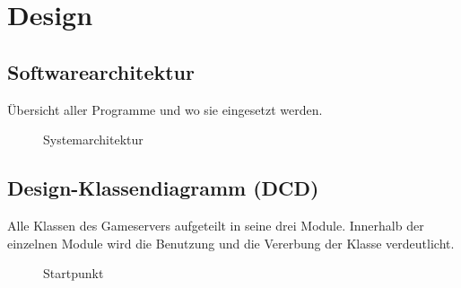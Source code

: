 \documentclass[11pt,ngerman]{article}
\begin{document}


    \section{Design}

    \subsection{Softwarearchitektur}
    Übersicht aller Programme und wo sie eingesetzt werden.
	\begin{figure}[H]
		\centering
		\caption{Systemarchitektur}
		\label{fig:Systemarchitecture}
	\end{figure}

    \subsection{Design-Klassendiagramm (DCD)}
    Alle Klassen des Gameservers aufgeteilt in seine drei Module. Innerhalb der einzelnen Module wird die Benutzung und die Vererbung der Klasse verdeutlicht.
	\begin{figure}[H]
		\centering
		\caption{Startpunkt}
		\label{fig:appmain_class}
	\end{figure}
\end{document}
